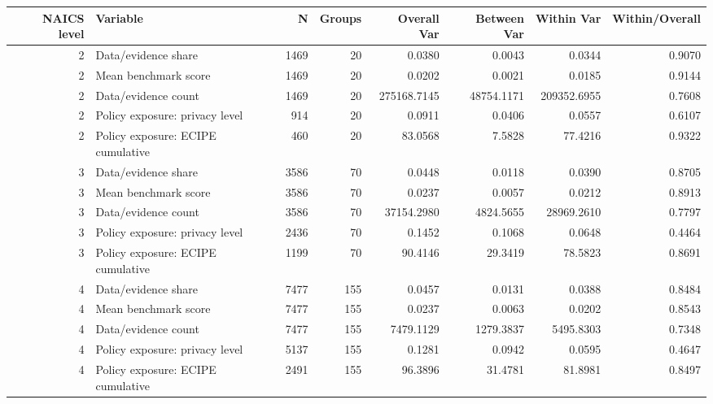 \begin{tabular}{rlrrrrrr}
\toprule
NAICS level & Variable & N & Groups & Overall Var & Between Var & Within Var & Within/Overall \\
\midrule
2 & Data/evidence share & 1469 & 20 & 0.0380 & 0.0043 & 0.0344 & 0.9070 \\
2 & Mean benchmark score & 1469 & 20 & 0.0202 & 0.0021 & 0.0185 & 0.9144 \\
2 & Data/evidence count & 1469 & 20 & 275168.7145 & 48754.1171 & 209352.6955 & 0.7608 \\
2 & Policy exposure: privacy level & 914 & 20 & 0.0911 & 0.0406 & 0.0557 & 0.6107 \\
2 & Policy exposure: ECIPE cumulative & 460 & 20 & 83.0568 & 7.5828 & 77.4216 & 0.9322 \\
3 & Data/evidence share & 3586 & 70 & 0.0448 & 0.0118 & 0.0390 & 0.8705 \\
3 & Mean benchmark score & 3586 & 70 & 0.0237 & 0.0057 & 0.0212 & 0.8913 \\
3 & Data/evidence count & 3586 & 70 & 37154.2980 & 4824.5655 & 28969.2610 & 0.7797 \\
3 & Policy exposure: privacy level & 2436 & 70 & 0.1452 & 0.1068 & 0.0648 & 0.4464 \\
3 & Policy exposure: ECIPE cumulative & 1199 & 70 & 90.4146 & 29.3419 & 78.5823 & 0.8691 \\
4 & Data/evidence share & 7477 & 155 & 0.0457 & 0.0131 & 0.0388 & 0.8484 \\
4 & Mean benchmark score & 7477 & 155 & 0.0237 & 0.0063 & 0.0202 & 0.8543 \\
4 & Data/evidence count & 7477 & 155 & 7479.1129 & 1279.3837 & 5495.8303 & 0.7348 \\
4 & Policy exposure: privacy level & 5137 & 155 & 0.1281 & 0.0942 & 0.0595 & 0.4647 \\
4 & Policy exposure: ECIPE cumulative & 2491 & 155 & 96.3896 & 31.4781 & 81.8981 & 0.8497 \\
\bottomrule
\end{tabular}
